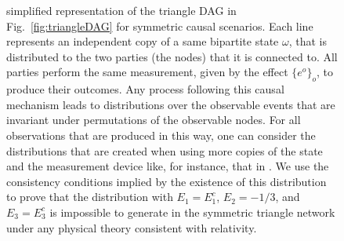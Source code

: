 \documentclass[aps,physrev,reprint,superscriptaddress,nofootinbib,twocolumn]{revtex4-2}
\begin{document}
\begin{figure}
    \centering
    \hspace{2cm}
    \caption{
        \protect{} simplified representation of the triangle DAG in Fig.~\ref{fig:triangleDAG} for symmetric causal scenarios.
        Each line represents an independent copy of a same bipartite state $\omega$, that is distributed to the two parties (the nodes) that it is connected to.
        All parties perform the same measurement, given by the effect $\{e^o\}_o$, to produce their outcomes.
        Any process following this causal mechanism leads to distributions over the observable events that are invariant under permutations of the observable nodes.
        For all observations that are produced in this way, one can consider the distributions that are created when using more copies of the state and the measurement device like, for instance, that in \protect{}.
        We use the consistency conditions implied by the existence of this distribution to prove that the distribution with $E_1=E_1^c$, $E_2=-1/3$, and $E_3=E_3^c$ is impossible to generate in the symmetric triangle network under any physical theory consistent with relativity.
        }
\end{figure}
\end{document}
